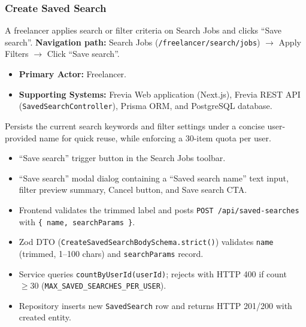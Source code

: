 \subsubsection{Create Saved Search}

A freelancer applies search or filter criteria on Search Jobs and clicks ``Save search''.\newline
\textbf{Navigation path:} Search Jobs (\texttt{/freelancer/search/jobs}) $\rightarrow$ Apply Filters $\rightarrow$ Click ``Save search''.


\begin{itemize}[leftmargin=1.6em,topsep=3pt,itemsep=2pt,parsep=0pt,label=$\bullet$]
    \item \textbf{Primary Actor:} Freelancer.
    \item \textbf{Supporting Systems:} Frevia Web application (Next.js), Frevia REST API (\texttt{SavedSearchController}), Prisma ORM, and PostgreSQL database.
\end{itemize}

\noindent Persists the current search keywords and filter settings under a concise user-provided name for quick reuse, while enforcing a 30-item quota per user.

\begin{itemize}[leftmargin=1.6em,topsep=3pt,itemsep=2pt,parsep=0pt,label=$\bullet$]
    \item ``Save search'' trigger button in the Search Jobs toolbar.
    \item ``Save search'' modal dialog containing a ``Saved search name'' text input, filter preview summary, Cancel button, and Save search CTA.
\end{itemize}

\begin{itemize}[leftmargin=1.6em,topsep=3pt,itemsep=2pt,parsep=0pt,label=$\bullet$]
    \item Frontend validates the trimmed label and posts \texttt{POST /api/saved-searches} with \texttt{\{ name, searchParams \}}.
    \item Zod DTO (\texttt{CreateSavedSearchBodySchema.strict()}) validates \texttt{name} (trimmed, 1--100 chars) and \texttt{searchParams} record.
    \item Service queries \texttt{countByUserId(userId)}; rejects with HTTP 400 if count $\ge 30$ (\texttt{MAX\_SAVED\_SEARCHES\_PER\_USER}).
    \item Repository inserts new \texttt{SavedSearch} row and returns HTTP 201/200 with created entity.
\end{itemize}

